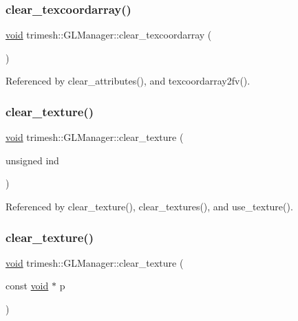 \subsubsection{\texorpdfstring{clear\+\_\+texcoordarray()}{clear\_texcoordarray()}}
{\footnotesize\ttfamily \hyperlink{namespacetrimesh_a784ddfd979e1c579bda795a8edfc3f43}{void} trimesh\+::\+G\+L\+Manager\+::clear\+\_\+texcoordarray (\begin{DoxyParamCaption}{ }\end{DoxyParamCaption})}



Referenced by clear\+\_\+attributes(), and texcoordarray2fv().

\mbox{\label{classtrimesh_1_1GLManager_ac5691c703028092195568c2ab75c85aa}} 
\subsubsection{\texorpdfstring{clear\+\_\+texture()}{clear\_texture()}\hspace{0.1cm}{\footnotesize\ttfamily [1/3]}}
{\footnotesize\ttfamily \hyperlink{namespacetrimesh_a784ddfd979e1c579bda795a8edfc3f43}{void} trimesh\+::\+G\+L\+Manager\+::clear\+\_\+texture (\begin{DoxyParamCaption}\item[{unsigned}]{ind }\end{DoxyParamCaption})}



Referenced by clear\+\_\+texture(), clear\+\_\+textures(), and use\+\_\+texture().

\mbox{\label{classtrimesh_1_1GLManager_aa2fefc1b88c7da4f9f31534c77049996}} 
\subsubsection{\texorpdfstring{clear\+\_\+texture()}{clear\_texture()}\hspace{0.1cm}{\footnotesize\ttfamily [2/3]}}
{\footnotesize\ttfamily \hyperlink{namespacetrimesh_a784ddfd979e1c579bda795a8edfc3f43}{void} trimesh\+::\+G\+L\+Manager\+::clear\+\_\+texture (\begin{DoxyParamCaption}\item[{const \hyperlink{namespacetrimesh_a784ddfd979e1c579bda795a8edfc3f43}{void} $\ast$}]{p }\end{DoxyParamCaption})\hspace{0.3cm}{\ttfamily [inline]}}

